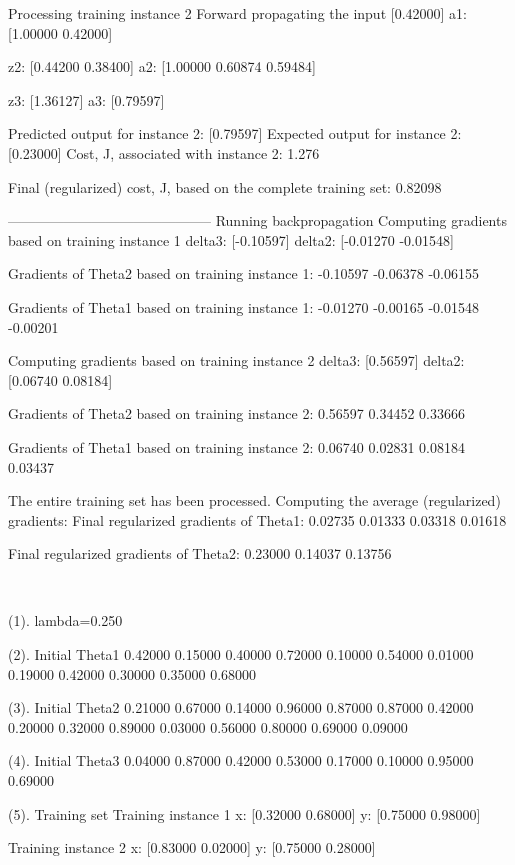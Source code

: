 \documentclass{article}
\begin{document}
Processing training instance 2
Forward propagating the input [0.42000]
a1: [1.00000   0.42000]

z2: [0.44200   0.38400]
a2: [1.00000   0.60874   0.59484]

z3: [1.36127]
a3: [0.79597]

Predicted output for instance 2: [0.79597]
Expected output for instance 2: [0.23000]
Cost, J, associated with instance 2: 1.276

Final (regularized) cost, J, based on the complete training set: 0.82098

--------------------------------------------
Running backpropagation
Computing gradients based on training instance 1
delta3: [-0.10597]
delta2: [-0.01270   -0.01548]

Gradients of Theta2 based on training instance 1:
-0.10597  -0.06378  -0.06155

Gradients of Theta1 based on training instance 1:
-0.01270  -0.00165
-0.01548  -0.00201

Computing gradients based on training instance 2
delta3: [0.56597]
delta2: [0.06740   0.08184]

Gradients of Theta2 based on training instance 2:
0.56597  0.34452  0.33666

Gradients of Theta1 based on training instance 2:
0.06740  0.02831
0.08184  0.03437

The entire training set has been processed. Computing the average (regularized) gradients:
Final regularized gradients of Theta1:
0.02735  0.01333
0.03318  0.01618

Final regularized gradients of Theta2:
0.23000  0.14037  0.13756

\\
\noindent {}

(1). lambda=0.250

(2). Initial Theta1
0.42000  0.15000  0.40000
0.72000  0.10000  0.54000
0.01000  0.19000  0.42000
0.30000  0.35000  0.68000

(3). Initial Theta2
0.21000  0.67000  0.14000  0.96000  0.87000
0.87000  0.42000  0.20000  0.32000  0.89000
0.03000  0.56000  0.80000  0.69000  0.09000

(4). Initial Theta3
0.04000  0.87000  0.42000  0.53000
0.17000  0.10000  0.95000  0.69000

(5). Training set
Training instance 1
x: [0.32000   0.68000]
y: [0.75000   0.98000]

Training instance 2
x: [0.83000   0.02000]
y: [0.75000   0.28000]
\end{document}
